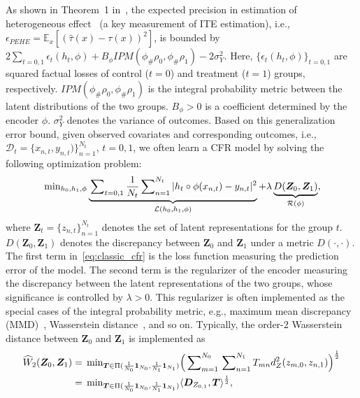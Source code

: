 \documentclass{article}
\begin{document}
As shown in Theorem~1 in~\cite{shalit2017estimating}, 
the expected precision in estimation of heterogeneous effect~\cite{hill2011bayesian} (a key measurement of ITE estimation), i.e., $\epsilon_{PEHE}=\mathbb{E}_{x}[(\hat{\tau}(x)-\tau(x))^2]$, is bounded by $2\sum_{t=0,1}\epsilon_{t}(h_t,\phi)+ B_{\phi}IPM(\phi_{\#}\rho_0,\phi_{\#}\rho_1)-2\sigma_Y^2$.
Here, $\{\epsilon_t(h_t,\phi)\}_{t=0,1}$ are squared factual losses of control ($t=0$) and treatment ($t=1$) groups, respectively. $IPM(\phi_{\#}\rho_0,\phi_{\#}\rho_1)$ is the integral probability metric between the latent distributions of the two groups. 
$B_{\phi}>0$ is a coefficient determined by the encoder $\phi$.
$\sigma_Y^2$ denotes the variance of outcomes.
Based on this generalization error bound, given observed covariates and corresponding outcomes, i.e., $\mathcal{D}_t=\{x_{n,t}, y_{n,t})\}_{n=1}^{N_t}$, $t=0,1$, we often learn a CFR model by solving the following optimization problem:
\begin{eqnarray}\label{eq:classic_cfr}
    \sideset{}{_{h_0,h_1,\phi}}\min \underbrace{\sideset{}{_{t=0,1}}\sum\frac{1}{N_t}\sideset{}{_{n=1}^{N_t}}\sum|h_t\circ \phi(x_{n,t})-y_{n,t}|^2}_{\mathcal{L}(h_0,h_1,\phi)} + \lambda \underbrace{D(\bm{Z}_0,\bm{Z}_1)}_{\mathcal{R}(\phi)},
\end{eqnarray}
where $\bm{Z}_t=\{z_{n,t}\}_{n=1}^{N_t}$ denotes the set of latent representations for the group $t$. 
$D(\bm{Z}_0,\bm{Z}_1)$ denotes the discrepancy between $\bm{Z}_0$ and $\bm{Z}_1$ under a metric $D(\cdot,\cdot)$. 
The first term in~\eqref{eq:classic_cfr} is the loss function measuring the prediction error of the model. 
The second term is the regularizer of the encoder measuring the discrepancy between the latent representations of the two groups, whose significance is controlled by $\lambda>0$. 
This regularizer is often implemented as the special cases of the integral probability metric, e.g., maximum mean discrepancy (MMD)~\cite{shalit2017estimating}, Wasserstein distance~\cite{wang2023optimal}, and so on.
Typically, the order-$2$ Wasserstein distance between $\bm{Z}_0$ and $\bm{Z}_1$ is implemented as
\begin{eqnarray}\label{eq:wd}
\begin{aligned}
    \widehat{W}_2(\bm{Z}_0,\bm{Z}_1)&=\sideset{}{_{\bm{T}\in\Pi(\frac{1}{N_0}\bm{1}_{N_0},\frac{1}{N_1}\bm{1}_{N_1})}}\min\Bigl(\sideset{}{_{m=1}^{N_0}}\sum\sideset{}{_{n=1}^{N_1}}\sum T_{mn}d_Z^2(z_{m,0},z_{n,1})\Bigr)^{\frac{1}{2}}\\
    &=\sideset{}{_{\bm{T}\in\Pi(\frac{1}{N_0}\bm{1}_{N_0},\frac{1}{N_1}\bm{1}_{N_1})}}\min\langle \bm{D}_{Z_{0,1}},\bm{T}\rangle^{\frac{1}{2}},
\end{aligned}
\end{eqnarray}
\end{document}

